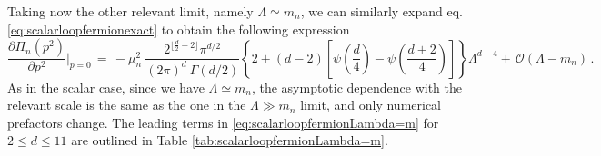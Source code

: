 Taking now the other relevant limit, namely $\Lambda \simeq m_n$, we can similarly expand eq. \eqref{eq:scalarloopfermionexact} to obtain the following expression
%
\begin{equation}
			\frac {\partial \Pi_n(p^2)}{\partial p^2} \bigg\rvert_{p=0} \, = \, - \mu_n^2 \ \frac{2^{\lfloor\frac{d}{2}-2 \rfloor}  \pi^{d/2}}{ (2 \pi)^d\ \Gamma(d/2) }   \left\{ 2+(d-2)\left[\psi\left( \frac{d}{4}\right)-  \psi\left( \frac{d+2}{4} \right)  \right] \right\} \Lambda^{d-4} + \, \mathcal{O}(\Lambda-m_n)   \, .
\label{eq:scalarloopfermionLambda=m}
\end{equation}
%
As in the scalar case, since we have $\Lambda\simeq m_n$, the asymptotic dependence with the relevant scale is the same as the one in the $\Lambda \gg m_n$ limit, and only numerical prefactors change. The leading terms in \eqref{eq:scalarloopfermionLambda=m} for $2\leq d \leq 11$ are outlined in Table \ref{tab:scalarloopfermionLambda=m}.
%
